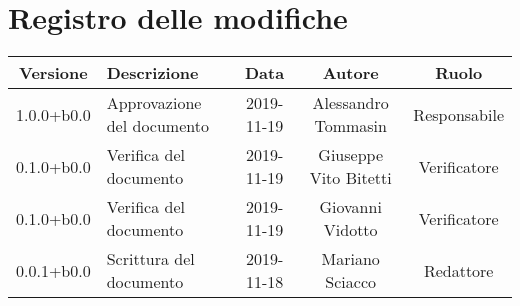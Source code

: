 \section*{Registro delle modifiche}

\begin{center}
	\begin{longtable}{|c|p{3cm}|c|c|c|}
	\hline
	\rowcolor{lighter-grayer}
	\textbf{Versione} & \textbf{Descrizione} & \textbf{Data} & \textbf{Autore} & \textbf{Ruolo} \\
	\hline
	\endfirsthead


	1.0.0+b0.0 & Approvazione del documento & 2019-11-19 & Alessandro Tommasin & Responsabile \\
	\hline
	0.1.0+b0.0 & Verifica del documento & 2019-11-19 & Giuseppe Vito Bitetti & Verificatore \\
	\hline
	0.1.0+b0.0 & Verifica del documento & 2019-11-19 & Giovanni Vidotto & Verificatore \\
	\hline
	0.0.1+b0.0 & Scrittura del documento & 2019-11-18 & Mariano Sciacco & Redattore \\

	\hline

	\end{longtable}
\end{center}
